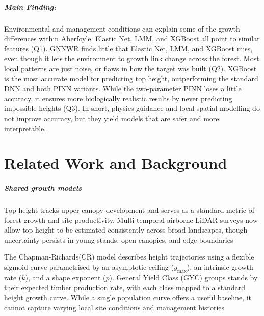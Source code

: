 \documentclass[logo,msc,ai]{infthesis}           %
\begin{document}
\paragraph*{Main Finding:}
Environmental and management conditions can explain some of the growth differences within Aberfoyle. Elastic Net, LMM, and XGBoost all point to similar features (Q1). GNNWR finds little that Elastic Net, LMM, and XGBoost miss, even though it lets the environment to growth link change across the forest. Most local patterns are just noise, or flaws in how the target was built (Q2). XGBoost is the most accurate model for predicting top height, outperforming the standard DNN and both PINN variants. While the two-parameter PINN loses a little accuracy, it ensures more biologically realistic results by never predicting impossible heights (Q3). In short, physics guidance and local spatial modelling do not improve accuracy, but they yield models that are safer and more interpretable.


\chapter{Related Work and Background} \label{ch:background}

\paragraph*{Shared growth models}
Top height tracks upper-canopy development and serves as a standard metric of forest growth and site productivity. Multi-temporal airborne LiDAR surveys now allow top height to be estimated consistently across broad landscapes, though uncertainty persists in young stands, open canopies, and edge boundaries \cite{ForestResearch2026Sitka_C1_SS, suarezminguez2008Practical_C1_SS}

The Chapman-Richards(CR) model describes height trajectories using a flexible sigmoid curve parametrised by an asymptotic ceiling ($y_{\max}$), an intrinsic growth rate ($k$), and a shape exponent ($p$). General Yield Class (GYC) groups stands by their expected timber production rate, with each class mapped to a standard height growth curve. While a single population curve offers a useful baseline, it cannot capture varying local site conditions and management histories \cite{chapman1961Statistical_C2_CR, pommerening2015Methods_C2_CR, mason2011Sitka_C1_SS}
\end{document}

